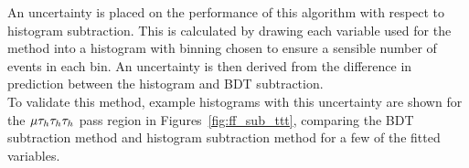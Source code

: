 An uncertainty is placed on the performance of this algorithm with respect to histogram subtraction.
This is calculated by drawing each variable used for the method into a histogram with binning chosen to ensure a sensible number of events in each bin.
An uncertainty is then derived from the difference in prediction between the histogram and BDT subtraction. \\

To validate this method, example histograms with this uncertainty are shown for the $\mu\tau_{h}\tau_{h}\tau_{h}$ pass region in Figures~\ref{fig:ff_sub_ttt}, comparing the BDT subtraction method and histogram subtraction method for a few of the fitted variables. \\

\begin{figure}[!hbtp]
\centering
     \\

\end{figure}
